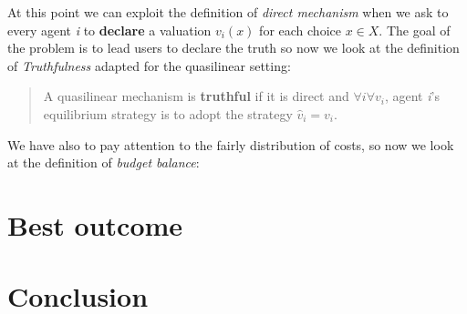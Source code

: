 \documentclass{article}
\begin{document}
{\begin{quote}
\end{quote}
At this point we can exploit the definition of \textit{direct mechanism} when we ask to every agent \textit{i }to \textbf{declare} a valuation $v_i(x)$ for each choice $x \in X$. The goal of the problem is to lead users to declare the truth so now we look at the definition of \textit{Truthfulness} adapted for the quasilinear setting:
\begin{quote}
    A quasilinear mechanism is \textbf{truthful} if it is direct and $\forall i \forall v_i$, agent \textit{i}'s equilibrium strategy is to adopt the strategy $\hat{v}_i = v_i$.
\end{quote}
We have also to pay attention to the fairly distribution of costs, so now we look at the definition of \textit{budget balance}:
\begin{quote}
    
\end{quote}
\begin{center}
    
\end{center}
}
\section{Best outcome}
\section{Conclusion}
\end{document}
